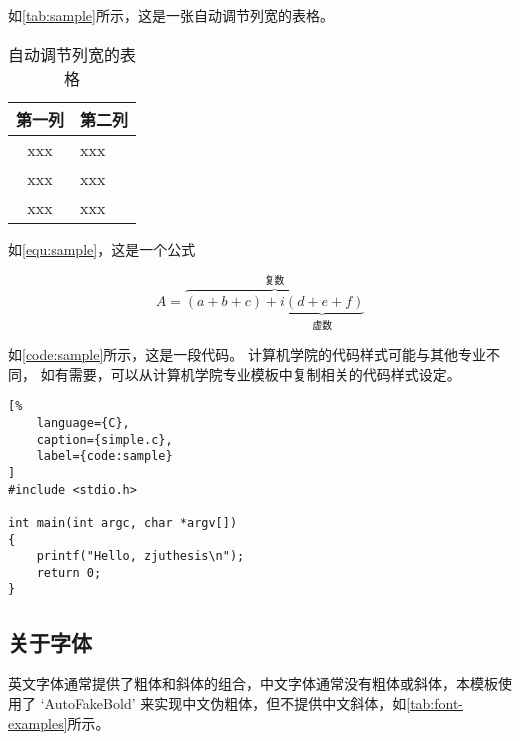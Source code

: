 \par 如\autoref{tab:sample}所示，这是一张自动调节列宽的表格。

\begin{table}[ht]
    \caption{\label{tab:sample}自动调节列宽的表格}
    \begin{tabularx}{\linewidth}{|c|X<{\centering}|}
        \hline
        第一列 & 第二列 \\ \hline
        xxx & xxx \\ \hline
        xxx & xxx \\ \hline
        xxx & xxx \\ \hline
    \end{tabularx}
\end{table}

\par 如\autoref{equ:sample}，这是一个公式

\begin{equation}
    \label{equ:sample}
    A=\overbrace{(a+b+c)+\underbrace{i(d+e+f)}_{\text{虚数}}}^{\text{复数}}
\end{equation}

\par 如\autoref{code:sample}所示，这是一段代码。
计算机学院的代码样式可能与其他专业不同，
如有需要，可以从计算机学院专业模板中复制相关的代码样式设定。

\begin{lstlisting}[%
    language={C},
    caption={simple.c},
    label={code:sample}
]
#include <stdio.h>

int main(int argc, char *argv[])
{
    printf("Hello, zjuthesis\n");
    return 0;
}
\end{lstlisting}

\subsection{关于字体}

英文字体通常提供了粗体和斜体的组合，中文字体通常没有粗体或斜体，本模板使用了 `AutoFakeBold' 来实现中文伪粗体，但不提供中文斜体，如\autoref{tab:font-examples}所示。

